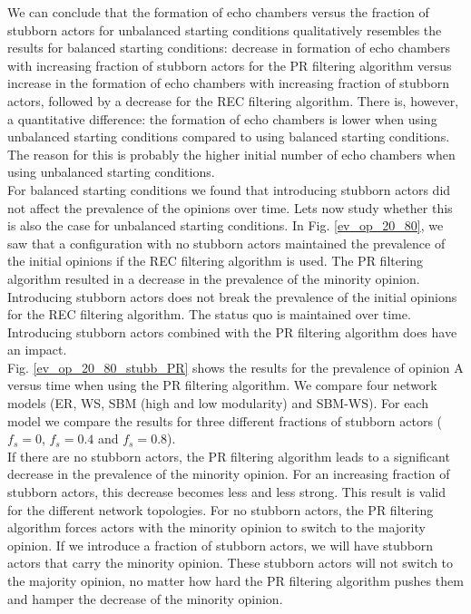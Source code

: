 \documentclass[11 pt , letterpaper , twoside , openright]{book}
\begin{document}
\newline
We can conclude that the formation of echo chambers versus the fraction of stubborn actors for unbalanced starting conditions qualitatively resembles the results for balanced starting conditions: decrease in formation of echo chambers with increasing fraction of stubborn actors for the PR filtering algorithm versus increase in the formation of echo chambers with increasing fraction of stubborn actors, followed by a decrease for the REC filtering algorithm. There is, however, a quantitative difference: the formation of echo chambers is lower when using unbalanced starting conditions compared to using balanced starting conditions. The reason for this is probably the higher initial number of echo chambers when using unbalanced starting conditions.\\
\newline
For balanced starting conditions we found that introducing stubborn actors did not affect the prevalence of the opinions over time. Lets now study whether this is also the case for unbalanced starting conditions. In Fig. \ref{ev_op_20_80}, we saw that a configuration with no stubborn actors maintained the prevalence of the initial opinions if the REC filtering algorithm is used. The PR filtering algorithm resulted in a decrease in the prevalence of the minority opinion. Introducing stubborn actors does not break the prevalence of the initial opinions for the REC filtering algorithm. The status quo is maintained over time. Introducing stubborn actors combined with the PR filtering algorithm does have an impact.\\
\newline
Fig. \ref{ev_op_20_80_stubb_PR} shows the results for the prevalence of opinion A versus time when using the PR filtering algorithm. We compare four network models (ER, WS, SBM (high and low modularity) and SBM-WS). For each model we compare the results for three different fractions of stubborn actors ($f_s=0$, $f_s=0.4$ and $f_s=0.8$).\\
\newline
If there are no stubborn actors, the PR filtering algorithm leads to a significant decrease in the prevalence of the minority opinion. For an increasing fraction of stubborn actors, this decrease becomes less and less strong. This result is valid for the different network topologies. For no stubborn actors, the PR filtering algorithm forces actors with the minority opinion to switch to the majority opinion. If we introduce a fraction of stubborn actors, we will have stubborn actors that carry the minority opinion. These stubborn actors will not switch to the majority opinion, no matter how hard the PR filtering algorithm pushes them and hamper the decrease of the minority opinion. 
\end{document}
